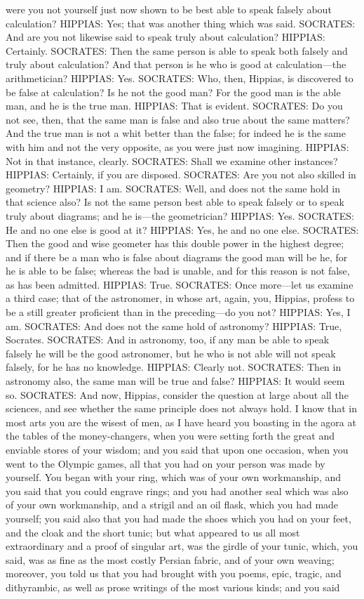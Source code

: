 \documentclass[11pt,letter]{article}
\begin{document}
were you not yourself just now shown to be best able to speak falsely about calculation? HIPPIAS:  Yes; that was another thing which was said. SOCRATES:  And are you not likewise said to speak truly about calculation? HIPPIAS:  Certainly. SOCRATES:  Then the same person is able to speak both falsely and truly about calculation? And that person is he who is good at calculation—the arithmetician? HIPPIAS:  Yes. SOCRATES:  Who, then, Hippias, is discovered to be false at calculation? Is he not the good man? For the good man is the able man, and he is the true man. HIPPIAS:  That is evident. SOCRATES:  Do you not see, then, that the same man is false and also true about the same matters? And the true man is not a whit better than the false; for indeed he is the same with him and not the very opposite, as you were just now imagining. HIPPIAS:  Not in that instance, clearly. SOCRATES:  Shall we examine other instances? HIPPIAS:  Certainly, if you are disposed. SOCRATES:  Are you not also skilled in geometry? HIPPIAS:  I am. SOCRATES:  Well, and does not the same hold in that science also? Is not the same person best able to speak falsely or to speak truly about diagrams; and he is—the geometrician? HIPPIAS:  Yes. SOCRATES:  He and no one else is good at it? HIPPIAS:  Yes, he and no one else. SOCRATES:  Then the good and wise geometer has this double power in the highest degree; and if there be a man who is false about diagrams the good man will be he, for he is able to be false; whereas the bad is unable, and for this reason is not false, as has been admitted. HIPPIAS:  True. SOCRATES:  Once more—let us examine a third case; that of the astronomer, in whose art, again, you, Hippias, profess to be a still greater proficient than in the preceding—do you not? HIPPIAS:  Yes, I am. SOCRATES:  And does not the same hold of astronomy? HIPPIAS:  True, Socrates. SOCRATES:  And in astronomy, too, if any man be able to speak falsely he will be the good astronomer, but he who is not able will not speak falsely, for he has no knowledge. HIPPIAS:  Clearly not. SOCRATES:  Then in astronomy also, the same man will be true and false? HIPPIAS:  It would seem so. SOCRATES:  And now, Hippias, consider the question at large about all the sciences, and see whether the same principle does not always hold. I know that in most arts you are the wisest of men, as I have heard you boasting in the agora at the tables of the money-changers, when you were setting forth the great and enviable stores of your wisdom; and you said that upon one occasion, when you went to the Olympic games, all that you had on your person was made by yourself. You began with your ring, which was of your own workmanship, and you said that you could engrave rings; and you had another seal which was also of your own workmanship, and a strigil and an oil flask, which you had made yourself; you said also that you had made the shoes which you had on your feet, and the cloak and the short tunic; but what appeared to us all most extraordinary and a proof of singular art, was the girdle of your tunic, which, you said, was as fine as the most costly Persian fabric, and of your own weaving; moreover, you told us that you had brought with you poems, epic, tragic, and dithyrambic, as well as prose writings of the most various kinds; and you said 
\end{document}
